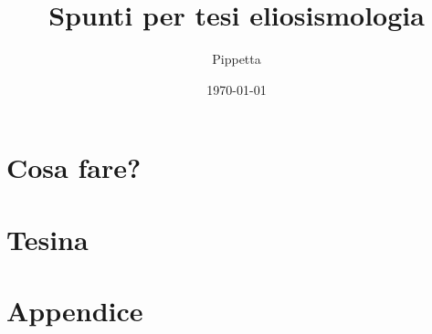 \documentclass[oneside,12pt,fleqn]{memoir}
\author{Pippetta}
\title{Spunti per tesi eliosismologia}
\date{\today}
\begin{document}
\frontmatter

\maketitle

\tableofcontents*
\listoffigures

\mainmatter


\part{Cosa fare?}



\part{Tesina}







\appendix
\part{Appendice}

\stopcontents[chapters]


\clearpage
{}
\printindex
\end{document}
